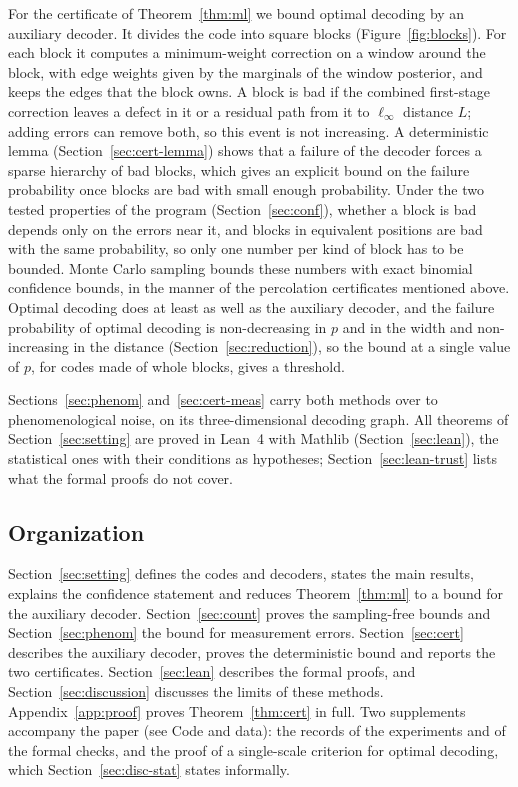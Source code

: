 \documentclass[11pt]{amsart}
\theoremstyle{definition}
\theoremstyle{remark}
\numberwithin{equation}{section}
\begin{document}
For the certificate of Theorem~\ref{thm:ml} we bound optimal decoding by an auxiliary decoder. It divides the code into square blocks (Figure~\ref{fig:blocks}). For each block it computes a minimum-weight correction on a window around the block, with edge weights given by the marginals of the window posterior, and keeps the edges that the block owns. A block is bad if the combined first-stage correction leaves a defect in it or a residual path from it to $\ell_\infty$ distance $L$; adding errors can remove both, so this event is not increasing. A deterministic lemma (Section~\ref{sec:cert-lemma}) shows that a failure of the decoder forces a sparse hierarchy of bad blocks, which gives an explicit bound on the failure probability once blocks are bad with small enough probability. Under the two tested properties of the program (Section~\ref{sec:conf}), whether a block is bad depends only on the errors near it, and blocks in equivalent positions are bad with the same probability, so only one number per kind of block has to be bounded. Monte Carlo sampling bounds these numbers with exact binomial confidence bounds, in the manner of the percolation certificates mentioned above. Optimal decoding does at least as well as the auxiliary decoder, and the failure probability of optimal decoding is non-decreasing in $p$ and in the width and non-increasing in the distance (Section~\ref{sec:reduction}), so the bound at a single value of $p$, for codes made of whole blocks, gives a threshold.

Sections~\ref{sec:phenom} and~\ref{sec:cert-meas} carry both methods over to phenomenological noise, on its three-dimensional decoding graph. All theorems of Section~\ref{sec:setting} are proved in Lean~4 \cite{dMU21} with Mathlib \cite{mathlib20} (Section~\ref{sec:lean}), the statistical ones with their conditions as hypotheses; Section~\ref{sec:lean-trust} lists what the formal proofs do not cover.

\subsection{Organization}
Section~\ref{sec:setting} defines the codes and decoders, states the main results, explains the confidence statement and reduces Theorem~\ref{thm:ml} to a bound for the auxiliary decoder. Section~\ref{sec:count} proves the sampling-free bounds and Section~\ref{sec:phenom} the bound for measurement errors. Section~\ref{sec:cert} describes the auxiliary decoder, proves the deterministic bound and reports the two certificates. Section~\ref{sec:lean} describes the formal proofs, and Section~\ref{sec:discussion} discusses the limits of these methods. Appendix~\ref{app:proof} proves Theorem~\ref{thm:cert} in full. Two supplements accompany the paper (see Code and data): the records of the experiments and of the formal checks, and the proof of a single-scale criterion for optimal decoding, which Section~\ref{sec:disc-stat} states informally.
\end{document}
